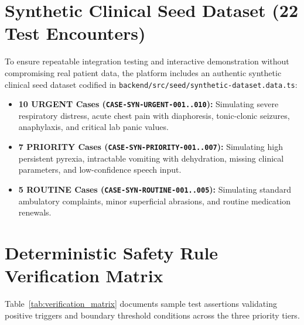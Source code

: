 \documentclass[11pt,a4paper,oneside]{report}
\begin{document}
\section{Synthetic Clinical Seed Dataset (22 Test Encounters)}
To ensure repeatable integration testing and interactive demonstration without compromising real patient data, the platform includes an authentic synthetic clinical seed dataset codified in \texttt{backend/src/seed/synthetic-dataset.data.ts}:
\begin{itemize}[leftmargin=20pt]
  \item \textbf{10 URGENT Cases (\texttt{CASE-SYN-URGENT-001..010}):} Simulating severe respiratory distress, acute chest pain with diaphoresis, tonic-clonic seizures, anaphylaxis, and critical lab panic values.
  \item \textbf{7 PRIORITY Cases (\texttt{CASE-SYN-PRIORITY-001..007}):} Simulating high persistent pyrexia, intractable vomiting with dehydration, missing clinical parameters, and low-confidence speech input.
  \item \textbf{5 ROUTINE Cases (\texttt{CASE-SYN-ROUTINE-001..005}):} Simulating standard ambulatory complaints, minor superficial abrasions, and routine medication renewals.
\end{itemize}

\section{Deterministic Safety Rule Verification Matrix}
Table~\ref{tab:verification_matrix} documents sample test assertions validating positive triggers and boundary threshold conditions across the three priority tiers.
\end{document}

